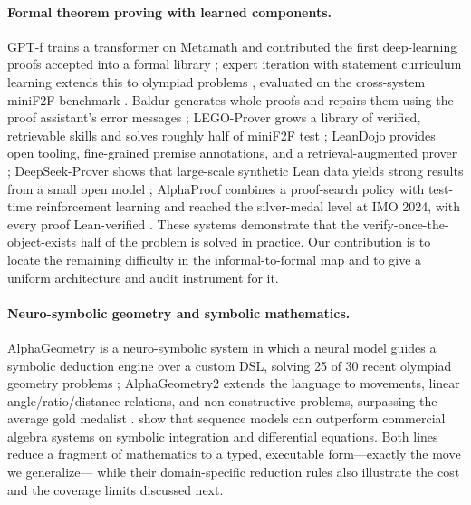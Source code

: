 \documentclass[11pt,a4paper]{article}
\theoremstyle{plain}
\theoremstyle{definition}
\theoremstyle{remark}
\begin{document}
\paragraph{Formal theorem proving with learned components.}
GPT-f trains a transformer on Metamath and contributed the first
deep-learning proofs accepted into a formal library
\citep{polu2020gptf}; expert iteration with statement curriculum learning
extends this to olympiad problems \citep{polu2022curriculum}, evaluated on
the cross-system miniF2F benchmark \citep{zheng2022minif2f}. Baldur
generates whole proofs and repairs them using the proof assistant's error
messages \citep{first2023baldur}; LEGO-Prover grows a library of verified,
retrievable skills and solves roughly half of miniF2F test
\citep{wang2024lego}; LeanDojo provides open tooling, fine-grained premise
annotations, and a retrieval-augmented prover \citep{yang2023leandojo};
DeepSeek-Prover shows that large-scale synthetic Lean data yields strong
results from a small open model \citep{xin2024deepseekprover}; AlphaProof
combines a proof-search policy with test-time reinforcement learning and
reached the silver-medal level at IMO 2024, with every proof Lean-verified
\citep{hubert2025alphaproof}. These systems demonstrate that the
verify-once-the-object-exists half of the problem is solved in practice.
Our contribution is to locate the remaining difficulty in the
informal-to-formal map and to give a uniform architecture and audit
instrument for it.

\paragraph{Neuro-symbolic geometry and symbolic mathematics.}
AlphaGeometry is a neuro-symbolic system in which a neural model guides a
symbolic deduction engine over a custom DSL, solving 25 of 30 recent
olympiad geometry problems \citep{trinh2024alphageometry}; AlphaGeometry2
extends the language to movements, linear angle/ratio/distance relations,
and non-constructive problems, surpassing the average gold medalist
\citep{chervonyi2025alphageometry2}. \citet{lample2020symbolic} show that
sequence models can outperform commercial algebra systems on symbolic
integration and differential equations. Both lines reduce a fragment of
mathematics to a typed, executable form---exactly the move we generalize---
while their domain-specific reduction rules also illustrate the cost and
the coverage limits discussed next.

\end{document}
